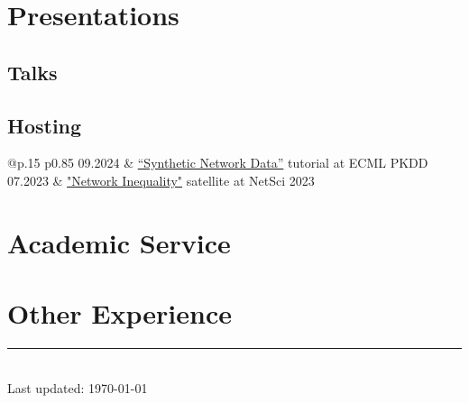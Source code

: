 \documentclass[11pt]{article} %
\begin{document}
\section*{Presentations}
\label{presentations}

\subsection*{Talks}

\subsection*{Hosting}
\label{hosting}
\begin{longtable}[l]{@{}p{.15\textwidth} p{0.85\textwidth}}
  09.2024     & \href{https://sites.google.com/view/snma-tutorial/2024}{“Synthetic Network Data”} tutorial at ECML PKDD\\
  07.2023     & \href{https://sites.google.com/view/netin-satellite-2023/home}{"Network Inequality"} satellite at NetSci 2023\\
\end{longtable}

\section*{Academic Service}
\label{service}


\section*{Other Experience}
\label{exp_other}



\centering
\rule{0.25\linewidth}{0.4pt}\\
\medskip
Last updated: \today
\end{document}
